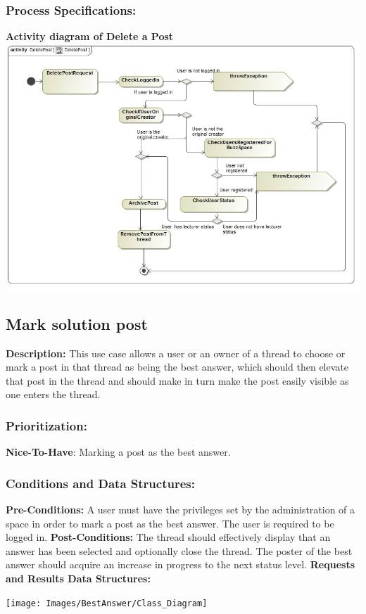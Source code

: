\documentclass[a4paper,11pt]{article}
\begin{document}
\subsubsection{Process Specifications:} 
\textbf{Activity diagram of Delete a Post}\\ 
\includegraphics[width=1\linewidth]{./Images/PostHandling/postDeletionAct.jpg}\\

\subsection{Mark solution post}
\textbf{Description:}
This use case allows a user or an owner of a thread to choose or mark a post in that thread as being the best answer, which should then elevate that post in the thread and should make in turn make the post easily visible as one enters the thread.
\subsubsection{Prioritization:} 
\textbf{Nice-To-Have}: Marking a post as the best answer.
\subsubsection{Conditions and Data Structures:}
\textbf{Pre-Conditions:}
A user must have the privileges set by the administration of a space in order to mark a post as the best answer. The user is required to be logged in.
\textbf{Post-Conditions:}
The thread should effectively display that an answer has been selected and optionally close the thread. The poster of the best answer should acquire an increase in progress to the next status level.
\textbf{Requests and Results Data Structures:}
\begin{center}
\texttt{[image: Images/BestAnswer/Class\_Diagram]}
\end{center}
\end{document}
